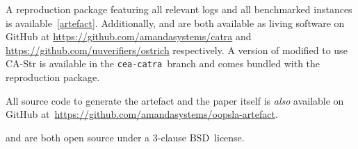 A reproduction package featuring all relevant logs and all benchmarked instances is available~\cref{artefact}.
Additionally, \Ostrich{} and \Catra{} are both available as living software
on GitHub at \url{https://github.com/amandasystems/catra} and \url{https://github.com/uuverifiers/ostrich}
respectively. A version of \Ostrich{} modified to use CA-Str is available in the \texttt{cea-catra}~branch
and comes bundled with the reproduction package.

All source code to generate the artefact and the paper itself is \emph{also} available on 
GitHub at~\url{https://github.com/amandasystems/oopsla-artefact}.

\Ostrich{} and \Catra{} are both open source under a 3-clause BSD~license.